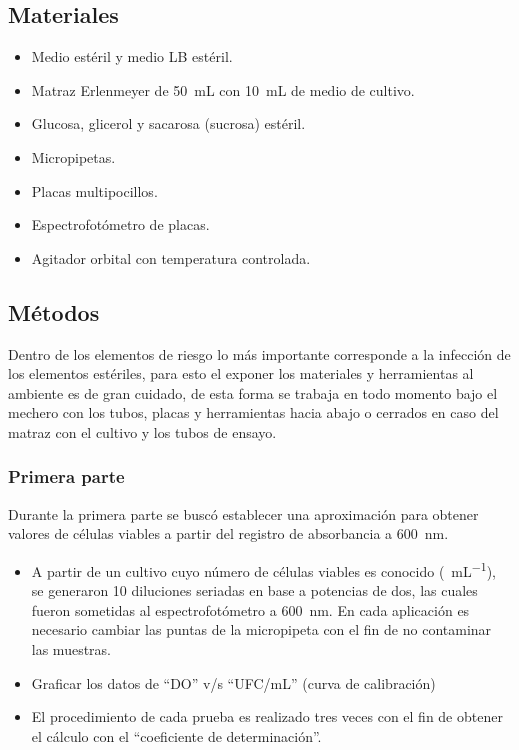 \subsection{Materiales}

\begin{multicols}{2}
  \begin{itemize}
    \item Medio estéril y medio LB estéril.
    \item Matraz Erlenmeyer de \SI{50}{\mL} con \SI{10}{\mL} de medio de cultivo.
    \item Glucosa, glicerol y sacarosa (sucrosa) estéril. 
    \item Micropipetas. 
    \item Placas multipocillos. 
    \item Espectrofotómetro de placas. 
    \item Agitador orbital con temperatura controlada.
  \end{itemize}
\end{multicols}

\subsection{Métodos}

Dentro de los elementos de riesgo lo más importante corresponde a la infección de los elementos estériles, para esto el exponer los materiales y herramientas al ambiente es de gran cuidado, de esta forma se trabaja en todo momento bajo el mechero con los tubos, placas y herramientas hacia abajo o cerrados en caso del matraz con el cultivo y los tubos de ensayo.


\subsubsection{Primera parte}

Durante la primera parte se buscó establecer una aproximación para obtener valores de células viables a partir del registro de absorbancia a \SI{600}{\nm}.
\begin{itemize}
  \item A partir de un cultivo cuyo número de células viables es conocido (\si{\ufc\per\mL}), se generaron 10 diluciones seriadas en base a potencias de dos, las cuales fueron sometidas al espectrofotómetro a \SI{600}{\nm}. En cada aplicación es necesario cambiar las puntas de la micropipeta con el fin de no contaminar las muestras.
  \item Graficar los datos de “DO” v/s “UFC/mL” (curva de calibración)
  \item El procedimiento de cada prueba es realizado tres veces con el fin de obtener el cálculo con el “coeficiente de determinación”. 
\end{itemize}

